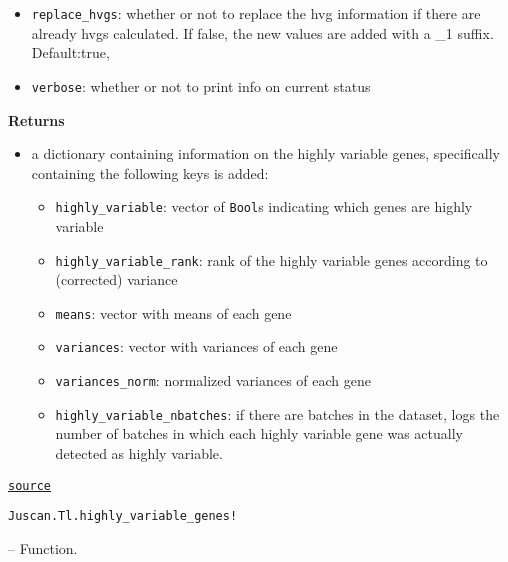 \documentclass[oneside]{memoir}
\begin{document}
\begin{adjustwidth}{2em}{0pt}
\begin{itemize}
\item \texttt{replace\_hvgs}: whether or not to replace the hvg information if there are already hvgs calculated. If false, the new values are added with a {\textquotedbl}\_1{\textquotedbl} suffix. Default:true,


\item \texttt{verbose}: whether or not to print info on current status

\end{itemize}
\textbf{Returns}

\begin{itemize}
\item a dictionary containing information on the highly variable genes, specifically containing the following keys is added: 

\begin{itemize}
\item \texttt{highly\_variable}: vector of \texttt{Bool}s indicating which genes are highly variable


\item \texttt{highly\_variable\_rank}: rank of the highly variable genes according to (corrected) variance 


\item \texttt{means}: vector with means of each gene


\item \texttt{variances}: vector with variances of each gene 


\item \texttt{variances\_norm}: normalized variances of each gene 


\item \texttt{highly\_variable\_nbatches}: if there are batches in the dataset, logs the number of batches in which each highly variable gene was actually detected as highly variable. 

\end{itemize}
\end{itemize}


\href{https://github.com/zehua0417/Juscan.jl/blob/393ad1b827b678ea98a738f92af658ee9ed9a403/src/tools/hvg.jl#L161-L199}{\texttt{source}}


\end{adjustwidth}
\hypertarget{3600658994016702584}{\texttt{Juscan.Tl.highly\_variable\_genes!}}  -- {Function.}
\end{document}
